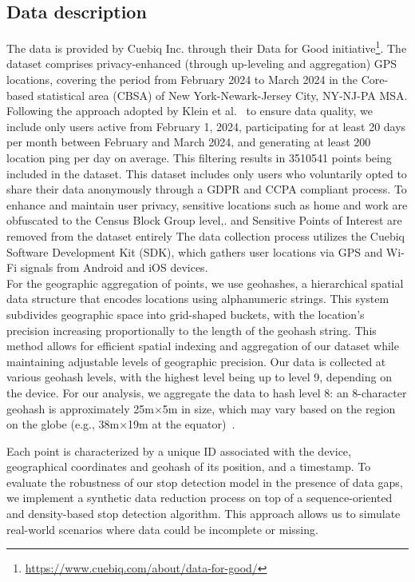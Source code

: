 \documentclass{article}
\begin{document}
\subsection{Data description}
The data is provided by Cuebiq Inc. through their Data for Good initiative\footnote{\url{https://www.cuebiq.com/about/data-for-good/}}.
The dataset comprises privacy-enhanced (through up-leveling and aggregation) GPS locations, covering the period from February 2024 to March 2024 in the Core-based statistical area (CBSA) of New York-Newark-Jersey City, NY-NJ-PA MSA. Following the approach adopted by Klein et al.~\citep{Klein2023} to ensure data quality, we include only users active from February 1, 2024, participating for at least 20 days per month between February and March 2024, and generating at least 200 location ping per day on average. This filtering results in 3510541 points being included in the dataset. This dataset includes only users who voluntarily opted to share their data anonymously through a GDPR and CCPA compliant process. To enhance and maintain user privacy, sensitive locations such as home and work are obfuscated to the Census Block Group level,. and Sensitive Points of Interest are removed from the dataset entirely The data collection process utilizes the Cuebiq Software Development Kit (SDK), which gathers user locations via GPS and Wi-Fi signals from Android and iOS devices.\\
For the geographic aggregation of points, we use geohashes, a hierarchical spatial data structure that encodes locations using alphanumeric strings. This system subdivides geographic space into grid-shaped buckets, with the location's precision increasing proportionally to the length of the geohash string. This method allows for efficient spatial indexing and aggregation of our dataset while maintaining adjustable levels of geographic precision.
Our data is collected at various geohash levels, with the highest level being up to level 9, depending on the device.
For our analysis, we aggregate the data to hash level 8: an 8-character geohash is approximately 25m$\times$5m in size, which may vary based on the region on the globe (e.g., 38m$\times$19m at the equator)~\citep{geohash}.

Each point is characterized by a unique ID associated with the device, geographical coordinates and geohash of its position, and a timestamp.
To evaluate the robustness of our stop detection model in the presence of data gaps, we implement a synthetic data reduction process on top of a sequence-oriented and density-based stop detection algorithm. This approach allows us to simulate real-world scenarios where data could be incomplete or missing.
\end{document}
